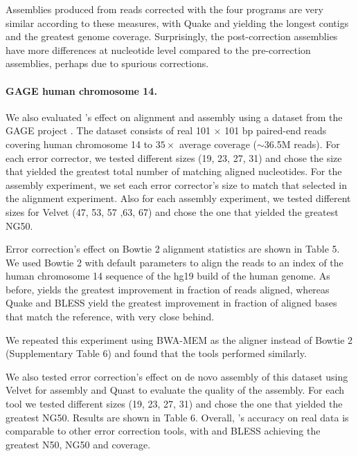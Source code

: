 \documentclass{bmcart}
\begin{document}
Assemblies produced from reads corrected with the four programs are very similar according to these measures, with Quake and \tool yielding the longest contigs and the greatest genome coverage. Surprisingly, the post-correction assemblies have more differences at nucleotide level compared to the pre-correction assemblies, perhaps due to spurious corrections.

\paragraph{GAGE human chromosome 14.}
We also evaluated \tool's effect on alignment and assembly using a dataset from the GAGE project \cite{salzberg2012gage}.  The dataset consists of real 101 $\times$ 101 bp paired-end reads covering human chromosome 14 to $35\times$ average coverage ($\sim$36.5M reads).  For each error corrector, we tested different \kmer sizes (19, 23, 27, 31) and chose the size that yielded the greatest total number of matching aligned nucleotides.  For the assembly experiment, we set each error corrector's \kmer size to match that selected in the alignment experiment.  Also for each assembly experiment, we tested different \kmer sizes for Velvet (47, 53, 57 ,63, 67) and chose the one that yielded the greatest NG50.

Error correction's effect on Bowtie 2 alignment statistics are shown in Table 5.  We used Bowtie 2 with default parameters to align the reads to an index of the human chromosome 14 sequence of the hg19 build of the human genome.  As before, \tool yields the greatest improvement in fraction of reads aligned, whereas Quake and BLESS yield the greatest improvement in fraction of aligned bases that match the reference, with \tool very close behind.

We repeated this experiment using BWA-MEM as the aligner instead of Bowtie 2 (Supplementary Table 6) and found that the tools performed similarly.

We also tested error correction's effect on de novo assembly of this dataset using Velvet for assembly and Quast to evaluate the quality of the assembly.  For each tool we tested different \kmer sizes (19, 23, 27, 31) and chose the one that yielded the greatest NG50.  Results are shown in Table 6.  Overall, \tool's accuracy on real data is comparable to other error correction tools, with \tool and BLESS achieving the greatest N50, NG50 and coverage.
\end{document}
